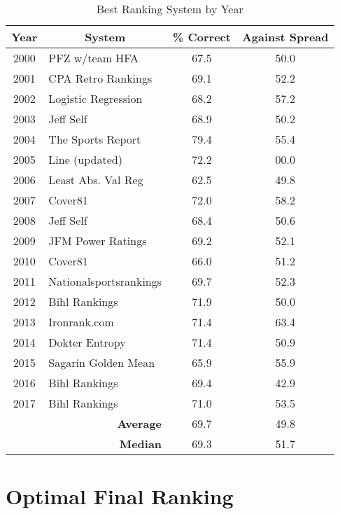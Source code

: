 \documentclass[11pt]{article}
\begin{document}
\begin{table}[!htb]
\begin{center}
\scriptsize
\begin{tabular}{|c|l|c|c|}
\hline
Year & \multicolumn{1}{|c|}{System} & \% Correct & Against Spread\\
\hline
2000 & PFZ w/team HFA & 67.5 & 50.0\\
2001 & CPA Retro Rankings & 69.1 & 52.2\\
2002 & Logistic Regression & 68.2 & 57.2\\
2003 & Jeff Self & 68.9 & 50.2\\
2004 & The Sports Report & 79.4 & 55.4\\
2005 & Line (updated) & 72.2 & 00.0\\
2006 & Least Abs. Val Reg & 62.5 & 49.8\\
2007 & Cover81 & 72.0 & 58.2\\
2008 & Jeff Self & 68.4 & 50.6\\
2009 & JFM Power Ratings & 69.2 & 52.1\\
2010 & Cover81 & 66.0 & 51.2\\
2011 & Nationalsportsrankings & 69.7 & 52.3\\
2012 & Bihl Rankings & 71.9 & 50.0\\
2013 & Ironrank.com & 71.4 & 63.4\\
2014 & Dokter Entropy & 71.4 & 50.9\\
2015 & Sagarin Golden Mean & 65.9 & 55.9\\
2016 & Bihl Rankings & 69.4 & 42.9\\
2017 & Bihl Rankings & 71.0 & 53.5\\
\hline
 & \multicolumn{1}{|r|}{\textbf{Average}} & 69.7 & 49.8\\
 & \multicolumn{1}{|r|}{\textbf{Median}} & 69.3 & 51.7\\
\hline
\end{tabular}
\caption{Best Ranking System by Year}\label{table:ranking_year}
\end{center}
\end{table}


\section{Optimal Final Ranking}\label{section:comparison}
\end{document}
